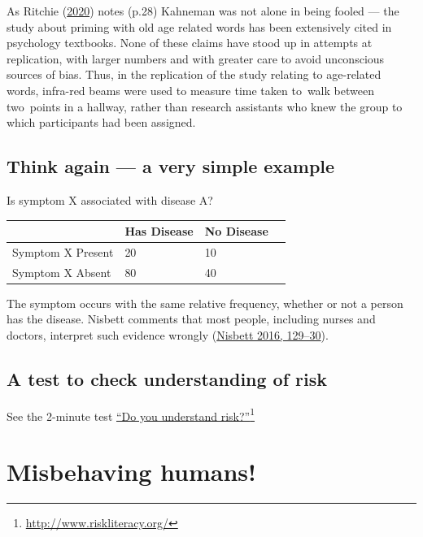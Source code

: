 \documentclass[
  10pt,
  b5paper]{book}
\begin{document}
As Ritchie (\protect\hyperlink{ref-ritchie2020science}{2020}) notes (p.28) Kahneman was not alone
in being fooled --- the study about priming with old age
related words has been extensively cited in
psychology textbooks. None of these claims have stood up
in attempts at replication, with larger numbers and with
greater care to avoid unconscious sources of bias. Thus,
in the replication of the study relating to age-related
words, infra-red beams were used to measure time taken
to~walk between two~points in a hallway, rather than
research assistants who knew the group to which
participants had been assigned.

\hypertarget{think-again-a-very-simple-example}{%
\subsection*{Think again --- a very simple example}\label{think-again-a-very-simple-example}}

Is symptom X associated with disease A?

\begin{longtable}[]{@{}llll@{}}
\toprule\noalign{}
& Has Disease & No Disease & \\
\midrule\noalign{}
\endhead
\bottomrule\noalign{}
\endlastfoot
Symptom X Present & 20 & 10 & \\
Symptom X Absent & 80 & 40 & \\
\end{longtable}

The symptom occurs with the same relative frequency, whether or
not a person has the disease.
Nisbett comments that most people, including nurses and doctors,
interpret such evidence wrongly (\protect\hyperlink{ref-nisbett}{Nisbett 2016, 129--30}).

\hypertarget{a-test-to-check-understanding-of-risk}{%
\subsection*{A test to check understanding of risk}\label{a-test-to-check-understanding-of-risk}}

See the 2-minute test
\href{http://www.riskliteracy.org/}{``Do you understand risk?''}\footnote{\url{http://www.riskliteracy.org/}}

\hypertarget{misbehaving-humans}{%
\section{Misbehaving humans!}\label{misbehaving-humans}}
\end{document}
